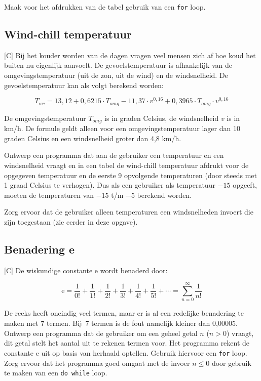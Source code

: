 \documentclass[a4paper,10pt,fleqn,twoside]{article}
\begin{document}
Maak voor het afdrukken van de tabel gebruik van een \lstinline|for| loop.

\subsection{Wind-chill temperatuur}[C]
Bij het kouder worden van de dagen vragen veel mensen zich af hoe koud het buiten nu eigenlijk aanvoelt. De gevoelstemperatuur is afhankelijk van de omgevingstemperatuur (uit de zon, uit de wind) en de windsnelheid. De gevoelstemperatuur kan als volgt berekend worden:

\begin{equation*}
T_{wc}=13,12 + 0,6215\cdot T_{omg} - 11,37\cdot v^{0,16} + 0,3965\cdot T_{omg}\cdot v^{0,16}
\end{equation*}

De omgevingstemperatuur $T_{omg}$ is in graden Celsius, de windsnelheid $v$ is in km/h. De formule geldt alleen voor een omgevingstemperatuur lager dan 10 graden Celsius en een windsnelheid groter dan 4,8 km/h.

Ontwerp een programma dat aan de gebruiker een temperatuur en een windsnelheid vraagt en in een tabel de wind-chill temperatuur afdrukt voor de opgegeven temperatuur en de eerste 9 opvolgende temperaturen (door steeds met 1 graad Celsius te verhogen). Dus als een gebruiker als temperatuur $-15$ opgeeft, moeten de temperaturen van $-15$ t/m $-5$ berekend worden.

Zorg ervoor dat de gebruiker alleen temperaturen een windsnelheden invoert die zijn toegestaan (zie eerder in deze opgave).

\subsection{Benadering e}[C]
De wiskundige constante e wordt benaderd door:

\begin{equation*}
\mathrm{e} = \dfrac{1}{0!} + \dfrac{1}{1!} + \dfrac{1}{2!} + \dfrac{1}{3!} + \dfrac{1}{4!} + \dfrac{1}{5!} + \cdots = \sum_{n=0}^{\infty} \dfrac{1}{n!}
\end{equation*}

De reeks heeft oneindig veel termen, maar er is al een redelijke benadering te maken met 7 termen. Bij~7 termen is de fout namelijk kleiner dan 0,00005. Ontwerp een programma dat de gebruiker om een geheel getal $n$ ($n > 0$) vraagt, dit getal stelt het aantal uit te rekenen termen voor. Het programma rekent de constante e uit op basis van herhaald optellen. Gebruik hiervoor een \lstinline|for| loop. Zorg ervoor dat het programma goed omgaat met de invoer $n \leq 0$ door gebruik te maken van een \lstinline|do while| loop.
\end{document}
